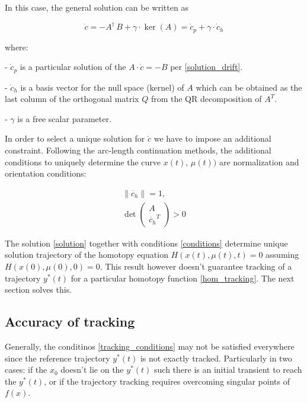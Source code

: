 \documentclass[11pt,american]{article}
\begin{document}
In this case, the general solution can be written as 

\begin{equation}\label{solution}
\dot c = -A^\dagger\,B + \gamma \cdot \ker(A) = \dot c_p + \gamma \cdot \dot c_h
\end{equation}

where:

- $\dot c_p$ is a particular solution of the $A \cdot \dot c = -B$ per \eqref{solution_drift}.

- $\dot c_h$ is a basis vector for the null space (kernel) of $A$ which can be obtained as the last column of the orthogonal matrix $Q$ from the QR decomposition of $A^T$.

- $\gamma$ is a free scalar parameter.

In order to select a unique solution for $\dot c$ we have to impose an additional constraint. Following the arc‐length continuation methods, the additional conditions to uniquely determine the curve $x(t),\,\mu(t))$ are normalization and orientation conditions:

\begin{equation}\label{conditions}
\begin{gathered}
\| \dot{c_h} \| = 1, \\
\det \begin{pmatrix} A \\ \dot{c_h}^T \end{pmatrix} > 0
\end{gathered}
\end{equation}

The solution \eqref{solution} together with conditions \eqref{conditions} determine unique solution trajectory of the homotopy equation $H(x(t),\mu(t),t)=0$ assuming $H(x(0),\mu(0),0)=0$. This result however doesn't guarantee tracking of a trajectory $y^*(t)$ for a particular homotopy function \eqref{hom_tracking}. The next section solves this.

\subsection{Accuracy of tracking}
 
Generally, the conditinos \eqref{tracking_conditions} may not be satisfied everywhere since the reference trajectory $y^*(t)$ is not exactly tracked. Particularly in two cases: if the $x_0$ doesn't lie on the $y^*(t)$ such there is an initial transient to reach the $y^*(t)$, or if the trajectory tracking requires overcoming singular points of $f(x)$.
\end{document}
